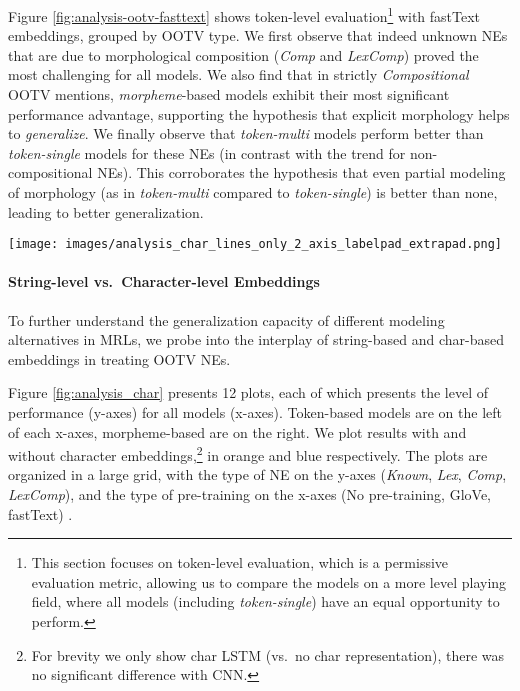 \documentclass[11pt,a4paper]{article}
\newcommand{\TOKMACRO}{{\em token-single}\xspace}
\newcommand{\MULMACRO}{{\em token-multi}\xspace}
\newcommand{\MORMACRO}{{\em morpheme}\xspace}
\begin{document}
Figure \ref{fig:analysis-ootv-fasttext} shows token-level evaluation\footnote{This section focuses on token-level  evaluation, which is a  permissive evaluation metric,
allowing us to compare the models on a more level playing field, where all models (including \TOKMACRO) have an equal opportunity to perform.}  with fastText embeddings, grouped by OOTV type. We first observe that indeed unknown NEs that are due to  morphological composition (\emph{Comp} and \emph{LexComp}) proved the most challenging for {all} models. We also find that in strictly \emph{Compositional} OOTV mentions, \MORMACRO-based models exhibit their most significant performance advantage, supporting the hypothesis that explicit {morphology} helps to {\em generalize}.  We finally observe that \MULMACRO models perform better than \TOKMACRO models for these NEs (in contrast with the trend for non-compositional  NEs). This  corroborates the hypothesis that even partial modeling of morphology (as in  \MULMACRO compared to \TOKMACRO) is better than none, leading to better generalization. 




\begin{figure*}[t]
  \texttt{[image: images/analysis\_char\_lines\_only\_2\_axis\_labelpad\_extrapad.png]}
  \caption{\label{fig:analysis_char} 
  Token-Level Eval.\ on Dev for Different OOTV Types, Char- and Word-Embeddings.}
\end{figure*}
\paragraph{String-level vs.\ Character-level Embeddings} 

To further understand the generalization capacity of different modeling alternatives in MRLs, we probe into the interplay of string-based and char-based embeddings in treating OOTV NEs. 

Figure \ref{fig:analysis_char} presents 12 plots, each of which  presents  the level of performance (y-axes)  for all models (x-axes). Token-based models are on the left of each x-axes, morpheme-based are on the right.  We plot results with and without character embeddings,\footnote{For brevity we only show char LSTM (vs.\ no char representation), there was no significant difference with CNN.} in orange and blue respectively. The plots are organized in a large grid, with the type of  NE  on the y-axes ({\em Known}, {\em Lex}, {\em Comp}, {\em LexComp}), and the type of  pre-training on the x-axes (No pre-training, GloVe, fastText) .  
\end{document}
